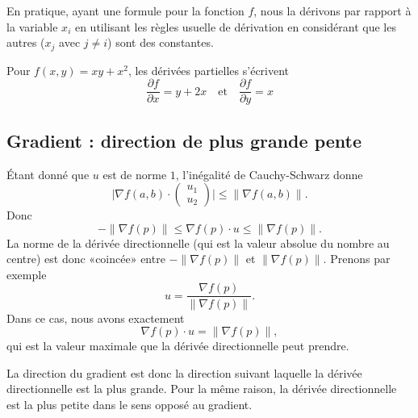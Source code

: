\begin{normaltext} \label{deriveepartielles}
	En pratique, ayant une formule pour la fonction \( f\), nous la dérivons par rapport à la variable \( x_i\) en utilisant les règles usuelle de dérivation en considérant que les autres (\( x_j\) avec \( j \neq i\)) sont des constantes.
\end{normaltext}

\begin{example}
	Pour \( f(x,y) = xy + x^2\), les dérivées partielles
	s'écrivent
	\begin{equation*}
		\frac{\partial f}{\partial x} = y + 2x \quad\text{et}\quad \frac{\partial f}{\partial y} = x
	\end{equation*}
\end{example}

\subsection{Gradient : direction de plus grande pente}

Étant donné que \( u\) est de norme \( 1\), l'inégalité de Cauchy-Schwarz donne
\begin{equation}
	\big| \nabla f(a,b)\cdot \begin{pmatrix}
		u_1 \\
		u_2
	\end{pmatrix}\big|\leq \| \nabla f(a,b) \|.
\end{equation}
Donc
\begin{equation}
	-\| \nabla f(p) \|\leq \nabla f(p)\cdot u\leq\| \nabla f(p) \|.
\end{equation}
La norme de la dérivée directionnelle (qui est la valeur absolue du nombre au centre) est donc «coincée» entre \( -\| \nabla f(p) \|\) et \( \| \nabla f(p) \|\). Prenons par exemple
\begin{equation}
	u=\frac{ \nabla f(p) }{ \| \nabla f(p) \| }.
\end{equation}
Dans ce cas, nous avons exactement
\begin{equation}
	\nabla f(p)\cdot u=\| \nabla f(p) \|,
\end{equation}
qui est la valeur maximale que la dérivée directionnelle peut prendre.

La direction du gradient est donc la direction suivant laquelle la dérivée directionnelle est la plus grande. Pour la même raison, la dérivée directionnelle est la plus petite dans le sens opposé au gradient.

